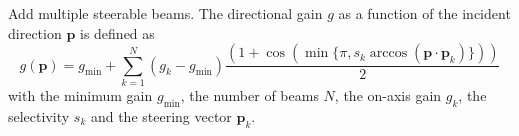 Add multiple steerable beams. The directional gain $g$ as a function
of the incident direction $\mathbf{p}$ is defined as
%
\begin{equation}
g(\mathbf{p}) = g_{\textrm{min}} + \sum\limits_{k=1}^N (g_k-g_{\textrm{min}})\frac{\left(1+\cos\left(\min\{\pi,s_k \arccos\left(\mathbf{p}\cdot\mathbf{p}_k\right)\}\right)\right)}{2}
\end{equation}
%
with the minimum gain $g_\textrm{min}$, the number of beams $N$, the
on-axis gain $g_k$, the selectivity $s_k$ and the steering vector
$\mathbf{p}_k$.


